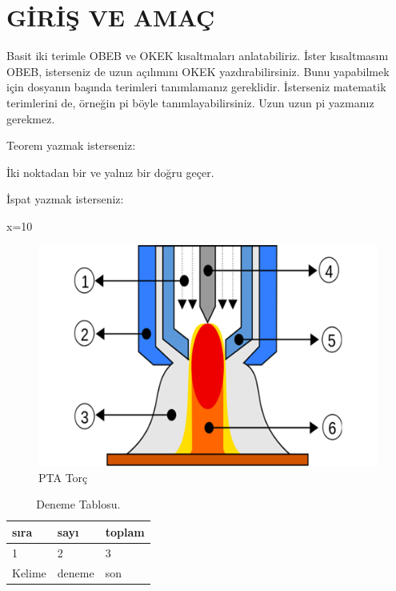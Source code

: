 \chapter{GİRİŞ VE AMAÇ}

Basit iki terimle \acrfull{OBEB} ve \acrfull{OKEK} kısaltmaları anlatabiliriz. İster kısaltmasını \acrshort{OBEB}, isterseniz de uzun açılımını \acrlong{OKEK} yazdırabilirsiniz. Bunu yapabilmek için dosyanın başında terimleri tanımlamanız gereklidir. İsterseniz matematik terimlerini de, örneğin \acrshort{pi} böyle tanımlayabilirsiniz. Uzun uzun \acrfull{pi} yazmanız gerekmez. 

Teorem yazmak isterseniz:
\begin{theorem}[Öklid]
 İki noktadan bir ve yalnız bir doğru geçer.
\end{theorem}

İspat yazmak isterseniz:
\begin{ispat}
x=10
\end{ispat}
\lipsum[1-2]
\begin{figure}[h]
\centering
\includegraphics[width=\textwidth]{gorseller/ptaTorc}
\caption{PTA Torç}\label{fig:PtaTorc1}
\end{figure}
\lipsum[1-2]
\begin{table}
\centering
\caption{Deneme Tablosu.}\label{tab:den1}
\begin{tabular}{|l|l|l|}
\hline
sıra   & sayı   & toplam \\ \hline
1      & 2      & 3      \\ \hline
Kelime & deneme & son    \\ \hline
\end{tabular}
\end{table}


